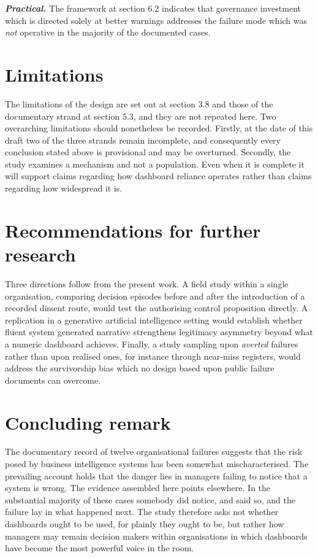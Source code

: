 \documentclass[12pt,a4paper]{article}
\begin{document}
\textbf{\emph{Practical.}} The framework at section 6.2 indicates that governance investment which is
directed solely at better warnings addresses the failure mode which was \emph{not} operative in the
majority of the documented cases.

\section{Limitations}

The limitations of the design are set out at section 3.8 and those of the documentary strand at section
5.3, and they are not repeated here. Two overarching limitations should nonetheless be recorded. Firstly,
at the date of this draft two of the three strands remain incomplete, and consequently every conclusion
stated above is provisional and may be overturned. Secondly, the study examines a mechanism and not a
population. Even when it is complete it will support claims regarding how dashboard reliance operates
rather than claims regarding how widespread it is.

\section{Recommendations for further research}

Three directions follow from the present work. A field study within a single organisation, comparing
decision episodes before and after the introduction of a recorded dissent route, would test the authorising
control proposition directly. A replication in a generative artificial intelligence setting would establish
whether fluent system generated narrative strengthens legitimacy asymmetry beyond what a numeric dashboard
achieves. Finally, a study sampling upon \emph{averted} failures rather than upon realised ones, for
instance through near-miss registers, would address the survivorship bias which no design based upon public
failure documents can overcome.

\section{Concluding remark}

The documentary record of twelve organisational failures suggests that the risk posed by business
intelligence systems has been somewhat mischaracterised. The prevailing account holds that the danger lies
in managers failing to notice that a system is wrong. The evidence assembled here points elsewhere. In the
substantial majority of these cases somebody did notice, and said so, and the failure lay in what happened
next. The study therefore asks not whether dashboards ought to be used, for plainly they ought to be, but
rather how managers may remain decision makers within organisations in which dashboards have become the
most powerful voice in the room.
\end{document}
